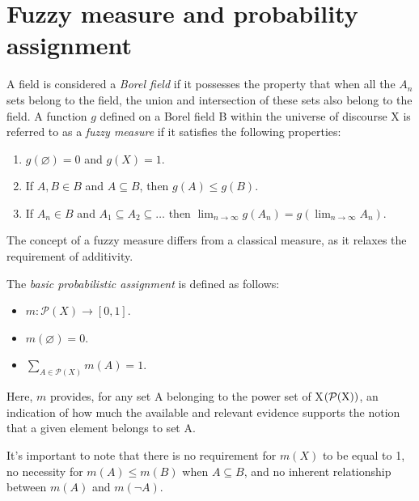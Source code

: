\documentclass[12pt, a4paper]{report}
\begin{document}
    \section{Fuzzy measure and probability assignment}
    \begin{definition}
        A field is considered a \emph{Borel field} if it possesses the property that when all the $A_n$ sets belong to the field, the union and intersection of these sets also belong to the field. 
        A function $g$ defined on a Borel field B within the universe of discourse X is referred to as a \emph{fuzzy measure} if it satisfies the following properties:
        \begin{enumerate}
            \item $g(\varnothing)=0$ and $g(X)=1$.
            \item If $A,B \in B$ and $A \subseteq B$, then $g(A) \leq g(B)$.
            \item If $A_n \in B$ and $A_1 \subseteq A_2 \subseteq \dots$ then $\lim_{n \to \infty}g(A_n)=g\left(\lim_{n \to \infty}A_n\right)$.
        \end{enumerate}
    \end{definition}
    The concept of a fuzzy measure differs from a classical measure, as it relaxes the requirement of additivity.
    \begin{definition}
        The \emph{basic probabilistic assignment} is defined as follows:
        \begin{itemize}
            \item $m:\mathcal{P}(X) \rightarrow [0,1]$.
            \item $m(\varnothing)=0$.
            \item $\sum_{A \in \mathcal{P}(X)}m(A)=1$.
        \end{itemize}
        Here, $m$ provides, for any set A belonging to the power set of X$(\mathcal{P}(\textnormal{X}))$, an indication of how much the available and relevant evidence supports the notion that a given element belongs to set A.
    \end{definition}
    It's important to note that there is no requirement for $m(X)$ to be equal to 1, no necessity for $m(A) \leq m(B)$ when $A\subseteq B$, and no inherent relationship between $m(A)$ and $m(\lnot A)$.
\end{document}
